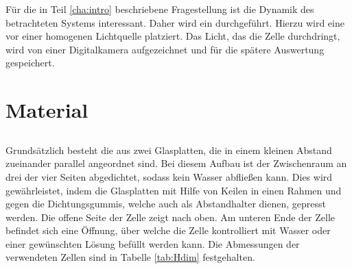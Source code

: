 \label{cha:set}


Für die in Teil \ref{cha:intro} beschriebene Fragestellung ist die Dynamik des betrachteten Systems interessant. Daher wird ein \LTM durchgeführt. Hierzu wird eine \HSC vor einer homogenen Lichtquelle platziert. Das Licht, das die Zelle durchdringt, wird von einer Digitalkamera aufgezeichnet
und für die spätere Auswertung gespeichert.

\section{Material}
\label{sec:marteria}

\subsection{\HSC}
\label{sec:hsc}
Grundsätzlich besteht die \HSC aus zwei Glasplatten, die in einem kleinen Abstand zueinander parallel angeordnet sind. Bei diesem Aufbau ist der Zwischenraum an drei der vier Seiten abgedichtet, sodass kein Wasser abfließen kann. Dies wird gewährleistet, indem die Glasplatten mit Hilfe von Keilen in einen Rahmen und gegen die Dichtungsgummis, welche auch als Abstandhalter dienen, gepresst werden. Die offene Seite der Zelle zeigt nach oben. Am unteren Ende der Zelle befindet sich eine Öffnung, über welche die Zelle kontrolliert mit Wasser oder einer gewünschten Lösung befüllt werden kann.
Die Abmessungen der verwendeten Zellen sind in Tabelle \ref{tab:Hdim} festgehalten.


